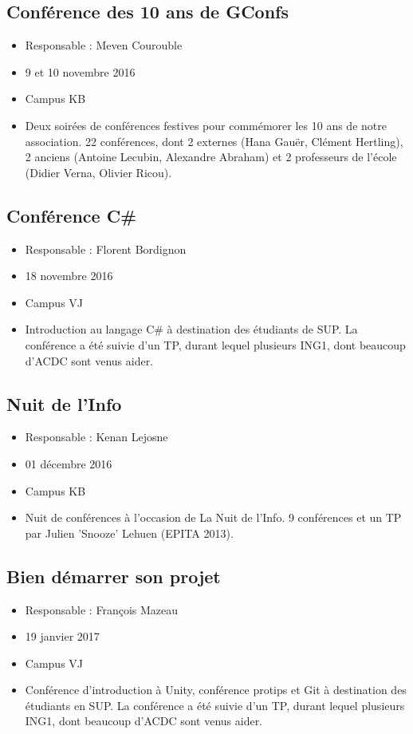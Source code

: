 \documentclass[12pt,a4paper]{article}
\begin{document}
\subsection{Conférence des 10 ans de GConfs}
\begin{itemize}
\item Responsable : Meven Courouble
\item 9 et 10 novembre 2016
\item Campus KB
\item Deux soirées de conférences festives pour commémorer les 10 ans de notre association. 22 conférences, dont 2 externes (Hana Gauër, Clément Hertling), 2 anciens (Antoine Lecubin, Alexandre Abraham) et 2 professeurs de l'école (Didier Verna, Olivier Ricou).
\end{itemize}

\subsection{Conférence C\#}
\begin{itemize}
\item Responsable : Florent Bordignon
\item 18 novembre 2016
\item Campus VJ
\item Introduction au langage C\# à destination des étudiants de SUP. La conférence a été suivie d'un TP, durant lequel plusieurs ING1, dont beaucoup d'ACDC sont venus aider.
\end{itemize}

\subsection{Nuit de l'Info}
\begin{itemize}
\item Responsable : Kenan Lejosne
\item 01 décembre 2016
\item Campus KB
\item Nuit de conférences à l'occasion de La Nuit de l'Info. 9 conférences et un TP par Julien 'Snooze' Lehuen (EPITA 2013).
\end{itemize}

\subsection{Bien démarrer son projet}
\begin{itemize}
\item Responsable : François Mazeau
\item 19 janvier 2017
\item Campus VJ
\item Conférence d'introduction à Unity, conférence protips et Git à destination des étudiants en SUP. La conférence a été suivie d'un TP, durant lequel plusieurs ING1, dont beaucoup d'ACDC sont venus aider.
\end{itemize}
\end{document}
